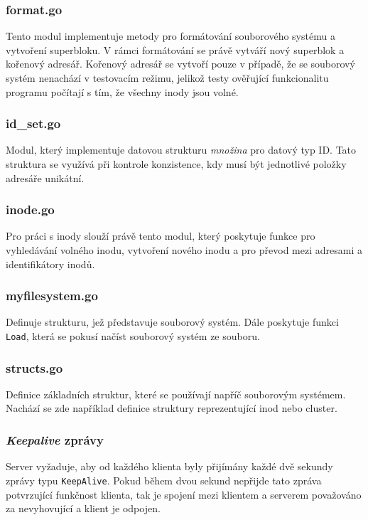 \documentclass[12pt, a4paper]{article}
\begin{document}
			\subsubsection{format.go}
Tento modul implementuje metody pro formátování souborového systému a vytvoření superbloku. V rámci formátování se právě vytváří nový superblok a kořenový adresář. Kořenový adresář se vytvoří pouze v případě, že se souborový systém nenachází v testovacím režimu, jelikož testy ověřující funkcionalitu programu počítají s tím, že všechny inody jsou volné.
					
			\subsubsection{id\_set.go}
Modul, který implementuje datovou strukturu \textit{množina} pro datový typ ID. Tato struktura se využívá při kontrole konzistence, kdy musí být jednotlivé položky adresáře unikátní.

			\subsubsection{inode.go}
Pro práci s inody slouží právě tento modul, který poskytuje funkce pro vyhledávání volného inodu, vytvoření nového inodu a pro převod mezi adresami a identifikátory inodů.

			\subsubsection{myfilesystem.go}
Definuje strukturu, jež představuje souborový systém. Dále poskytuje funkci \texttt{Load}, která se pokusí načíst souborový systém ze souboru. 

			\subsubsection{structs.go}
Definice základních struktur, které se používají napříč souborovým systémem. Nachází se zde například definice struktury reprezentující inod nebo cluster.


			
			\subsubsection{\textit{Keepalive} zprávy}
			Server vyžaduje, aby od každého klienta byly přijímány každé dvě sekundy zprávy typu \texttt{KeepAlive}. Pokud během dvou sekund nepřijde tato zpráva potvrzující funkčnost klienta, tak je spojení mezi klientem a serverem považováno za nevyhovující a klient je odpojen.
	
\end{document}
